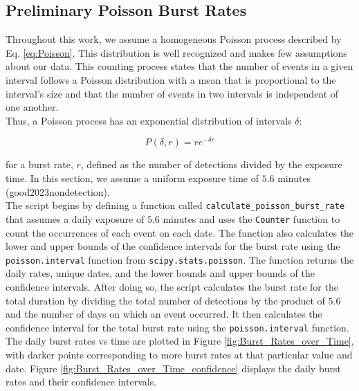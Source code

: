 \documentclass[twocolumn]{aastex631}
\begin{document}
\subsection{Preliminary Poisson Burst Rates}

\indent Throughout this work, we assume a homogeneous Poisson process described by Eq. \ref{eq:Poisson}. This distribution is well recognized and makes few assumptions about our data. This counting process states that the number of events in a given interval follows a Poisson distribution with a mean that is proportional to the interval's size and that the number of events in two intervals is independent of one another.\\
\indent Thus, a Poisson process has an exponential distribution of intervals $\delta$:

\begin{equation}
P(\delta,r)=re^{-\delta r} \label{eq:Poisson}
\end{equation}

for a burst rate, $r$, defined as the number of detections divided by the exposure time. In this section, we assume a uniform exposure time of $5.6$ minutes (good2023nondetection).\\
\indent The script begins by defining a function called \texttt{calculate{\_}poisson{\_}burst{\_}rate} that assumes a daily exposure of $5.6$ minutes and uses the \texttt{Counter} function to count the occurrences of each event on each date. The function also calculates the lower and upper bounds of the confidence intervals for the burst rate using the \texttt{poisson.interval} function from \texttt{scipy.stats.poisson}. The function returns the daily rates, unique dates, and the lower bounds and upper bounds of the confidence intervals. After doing so, the script calculates the burst rate for the total duration by dividing the total number of detections by the product of $5.6$ and the number of days on which an event occurred. It then calculates the confidence interval for the total burst rate using the \texttt{poisson.interval} function. The daily burst rates vs time are plotted in Figure \ref{fig:Burst_Rates_over_Time}, with darker points corresponding to more burst rates at that particular value and date. Figure \ref{fig:Burst_Rates_over_Time_confidence} displays the daily burst rates and their confidence intervals. 
\end{document}
